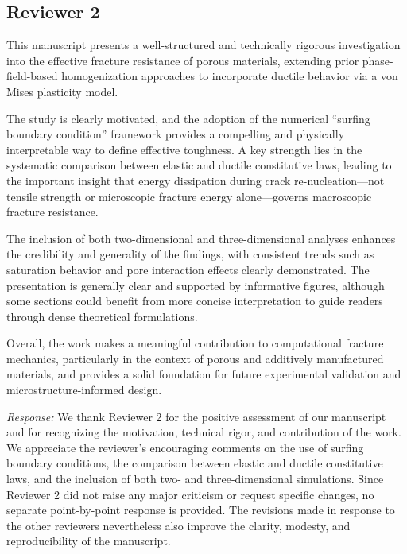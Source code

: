\documentclass[pdflatex,sn-mathphys-num]{sn-jnl}
\begin{document}

\subsection*{Reviewer 2}

This manuscript presents a well-structured and technically rigorous investigation into the effective fracture resistance of porous materials, extending prior phase-field-based homogenization approaches to incorporate ductile behavior via a von Mises plasticity model.

The study is clearly motivated, and the adoption of the numerical “surfing boundary condition” framework provides a compelling and physically interpretable way to define effective toughness. A key strength lies in the systematic comparison between elastic and ductile constitutive laws, leading to the important insight that energy dissipation during crack re-nucleation—not tensile strength or microscopic fracture energy alone—governs macroscopic fracture resistance.

The inclusion of both two-dimensional and three-dimensional analyses enhances the credibility and generality of the findings, with consistent trends such as saturation behavior and pore interaction effects clearly demonstrated. The presentation is generally clear and supported by informative figures, although some sections could benefit from more concise interpretation to guide readers through dense theoretical formulations.

Overall, the work makes a meaningful contribution to computational fracture mechanics, particularly in the context of porous and additively manufactured materials, and provides a solid foundation for future experimental validation and microstructure-informed design.

\emph{Response:} We thank Reviewer 2 for the positive assessment of our manuscript and for recognizing the motivation, technical rigor, and contribution of the work. We appreciate the reviewer's encouraging comments on the use of surfing boundary conditions, the comparison between elastic and ductile constitutive laws, and the inclusion of both two- and three-dimensional simulations. Since Reviewer 2 did not raise any major criticism or request specific changes, no separate point-by-point response is provided. The revisions made in response to the other reviewers nevertheless also improve the clarity, modesty, and reproducibility of the manuscript.
\end{document}
